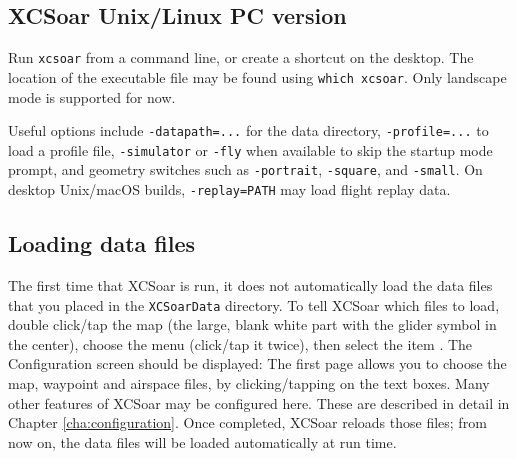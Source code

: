 \subsection*{XCSoar Unix/Linux PC version}
Run \verb|xcsoar| from a command line, or create a shortcut on the
desktop.  The location of the executable file may be found using
\verb|which xcsoar|.  Only landscape mode is  supported for now.

Useful options include \verb|-datapath=...| for the data directory,
\verb|-profile=...| to load a profile file, \verb|-simulator| or \verb|-fly|
when available to skip the startup mode prompt, and geometry switches such as
\verb|-portrait|, \verb|-square|, and \verb|-small|.
On desktop Unix/macOS builds, \verb|-replay=PATH| may load flight replay data.

\subsection*{Loading data files}\label{sec:loaddatafiles}
The first time that XCSoar is run, it does not automatically load the 
data files that you placed in the \verb|XCSoarData| directory.  
To tell XCSoar which files to load, double click/tap the map (the large,
blank white part with the glider symbol in the center),
choose the menu  (click/tap it twice), then select the item 
\mbox{.}  The Configuration screen should be displayed:
The first page allows you to choose the map, 
waypoint and airspace files, by clicking/tapping on the text boxes.
Many other features of XCSoar may be configured here. These are described in detail in Chapter
\ref{cha:configuration}.
Once completed, XCSoar reloads those files; from now on, the data files
will be loaded automatically at run time.

